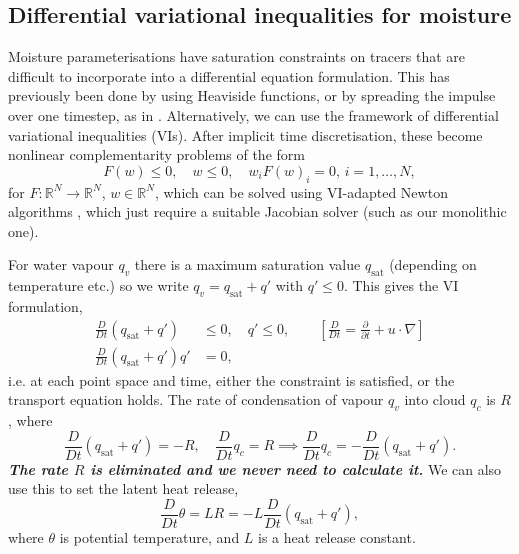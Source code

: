 \documentclass[
]{ImperialPoster}
\DeclareMathOperator{\sat}{sat}
\newcommand{\pp}[2]{\frac{\partial #1}{\partial #2}}
\newcommand{\DD}[2]{\frac{D #1}{D #2}}
\begin{document}
\begin{multicols}{3}
\vspace{-10mm}
\section{Differential variational inequalities for moisture}
Moisture parameterisations have saturation constraints on tracers that
are difficult to incorporate into a differential equation formulation.
This has previously been done by using Heaviside functions, or by
spreading the impulse over one timestep, as in
\cite{zerroukat2015moist,rostami2018improved}. Alternatively, we can
use the framework of differential variational inequalities
(VIs). After implicit time discretisation, these become nonlinear
complementarity problems of the form
\[
{F}({w}) \leq 0, \quad {w} \leq 0, \quad w_iF(w)_i=0, \, i=1,\ldots,N,
\]
for $F:\mathbb{R}^N\to \mathbb{R}^N$, $w\in \mathbb{R}^N$, which can
be solved using VI-adapted Newton algorithms \cite{bueler2020petsc},
which just require a suitable Jacobian solver (such as our monolithic
one).

For water vapour $q_v$ there is a maximum saturation value $q_{\sat}$
(depending on temperature etc.) so we write $q_v=q_{\sat}+q'$ with
$q'\leq 0$. This gives the VI formulation,
\begin{align*}
\DD{}{t}(q_{\sat}+q') & \leq 0,  \quad
q' \leq 0, \qquad \left[ \DD{}{t} = \pp{}{t} + u\cdot \nabla\right] \\
\DD{}{t}(q_{\sat}+q')q' & = 0, 
\end{align*}
i.e. at each point space and time, either the constraint is satisfied,
or the transport equation holds.
The rate of condensation of vapour $q_v$ into cloud $q_c$ is $R$, where
\[
\DD{}{t}(q_{\sat}+q') = -R, \quad
\DD{}{t}q_c = R \implies
\DD{}{t}q_c = -\DD{}{t}(q_{\sat}+q').
\]
\emph{\bfseries The rate $R$ is eliminated and we never need to calculate it.}
We can also use this to set the latent heat release,
\[
\DD{}{t}\theta = LR = -L\DD{}{t}(q_{\sat}+q'),
\]
where $\theta$ is potential temperature, and $L$ is a heat release constant.



\end{multicols}
\end{document}
